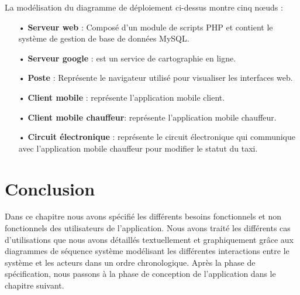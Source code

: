 {La modélisation du diagramme de déploiement ci-dessus montre cinq nœuds :
\begin{itemize}
\item[•]  \textbf{Serveur web} : Composé d'un module de scripts PHP et contient le système de gestion de base de données MySQL.
\item[•] \textbf{Serveur google} : est un service de cartographie en ligne.
\item[•] \textbf{Poste} : Représente le navigateur utilisé pour visualiser les interfaces web.
\item[•] \textbf{Client mobile} : représente l'application mobile client.
\item[•] \textbf{Client mobile chauffeur}: représente l'application mobile chauffeur.
\item[•] \textbf{Circuit électronique} : représente le circuit électronique qui communique avec l'application mobile chauffeur pour modifier le statut du taxi.
\end{itemize}


\section*{Conclusion}
Dans ce chapitre nous avons spécifié les différents besoins fonctionnels et non fonctionnels des utilisateurs de l'application. Nous avons traité les différents cas d'utilisations que nous avons détaillés textuellement et graphiquement grâce aux diagrammes de séquence système modélisant les différentes interactions entre le système et les acteurs dans un ordre chronologique. Après la phase de spécification, nous passons à la phase de conception de l'application dans le chapitre suivant.









}
